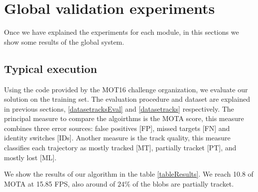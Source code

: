 \section{Global validation experiments}\label{valdiation}

Once we have explained the experiments for each module, in this sections we show some results of the global system.


\subsection{Typical execution}



Using the code provided by the MOT16 challenge organization, we evaluate our solution on the training set. The evaluation procedure and dataset are explained in previous sections,  \ref{datasetracksEval} and \ref{datasetracks} respectively. The principal measure to compare the algoirthms is the MOTA score, this measure combines three error sources: false positives [FP], missed targets [FN] and identity switches [IDs]. Another measure is the track quality, this measure classifies each trajectory as mostly tracked [MT], partially tracket [PT], and mostly lost [ML]. 


We show the results of our algorithm in the table \ref{tableResults}. We reach 10.8 of MOTA at 15.85 FPS, also around of $24 \%$  of the blobs are partially tracket.




%


